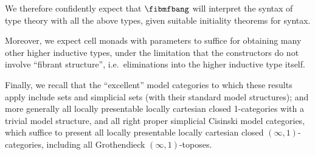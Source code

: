 \documentclass[referee]{psp}
\begin{document}
We therefore confidently expect that $\fibmfbang$ will interpret the syntax of type theory with all the above types, given suitable initiality theorems for syntax.

Moreover, we expect cell monads with parameters to suffice for obtaining many other higher inductive types, under the limitation that the constructors do not involve ``fibrant structure'', i.e.\ eliminations into the higher inductive type itself.

Finally, we recall that the ``excellent'' model categories to which these results apply include sets and simplicial sets (with their standard model structures); and more generally all locally presentable locally cartesian closed 1-categories with a trivial model structure, and all right proper simplicial Cisinski model categories, which suffice to present all locally presentable locally cartesian closed $(\infty,1)$-categories, including all Grothendieck $(\infty,1)$-toposes.
 


\end{document}
